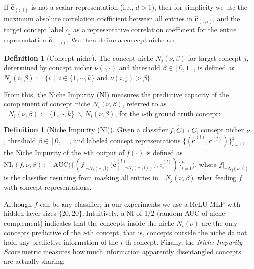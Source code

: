 \documentclass[withindex,glossary]{cam-thesis}
\theoremstyle{plain}
\theoremstyle{definition}
\newtheorem{definition}[theorem]{Definition}
\theoremstyle{remark}
\begin{document}
If $\mathbf{\hat{c}}_{(:, i)}$ is not a scalar representation (i.e., $d > 1$), then for simplicity we use the maximum absolute correlation coefficient between all entries in $\mathbf{\hat{c}}_{(:, i)}$, and the target concept label $c_j$ as a representative correlation coefficient for the entire representation $\mathbf{\hat{c}}_{(:, i)}$. We then define a concept niche as: 
\begin{definition}[Concept niche]
The concept niche $N_j(\nu, \beta)$ for target concept $j$, determined by concept nicher $\nu(\cdot, \cdot)$ and threshold $\beta \in [0,1]$, is defined as $N_j(\nu, \beta) := \big\{i \ \ | \ \ i \in \{1, \cdots, k\} \text{ and } \nu(i, j) > \beta \big\}$.
\end{definition}

From this, the Niche Impurity (NI) measures the predictive capacity of the complement of concept niche $N_i(\nu, \beta)$, referred to as $\neg N_i(\nu, \beta) := \{1, \cdots, k\} \; \backslash \; N_i(\nu, \beta)$, for the $i$-th ground truth concept:

\begin{definition}[Niche Impurity (NI)] \label{def:niche_impurity}
Given a classifier $f: \hat{C} \mapsto C$, concept nicher $\nu$, threshold $\beta \in [0, 1]$, and labeled concept representations $\{(\mathbf{\hat{c}}^{(l)}, \mathbf{c}^{(l)})\}_{l = 1}^n$, the Niche Impurity of the $i$-th output of $f(\cdot)$ is defined as $\text{NI}_i(f, \nu, \beta) := \text{AUC} \big( \{( f|_{\neg N_i(\nu, \beta)} \big( \mathbf{\hat{c}}^{(l)}_{(:, \neg N_i(\nu, \beta))} \big), c^{(l)}_i) \}_{l=1}^n \big)$, where $f|_{\neg N_j(\nu, \beta)}$
is the classifier resulting from masking all entries in $\neg N_j(\nu, \beta)$ when feeding $f$ with concept representations. 
\end{definition}

Although $f$ can be any classifier, in our experiments we use a ReLU MLP with hidden layer sizes $\{ 20, 20 \}$.
Intuitively, a NI of $1/2$ (random AUC of niche complement) indicates that the concepts inside the niche $N_i(\nu)$ are the only concepts predictive of the $i$-th concept, that is, concepts outside the niche do not hold any predictive information of the $i$-th concept.
Finally, the \textit{Niche Impurity Score} metric measures how much information apparently disentangled concepts
are actually sharing:
\end{document}
